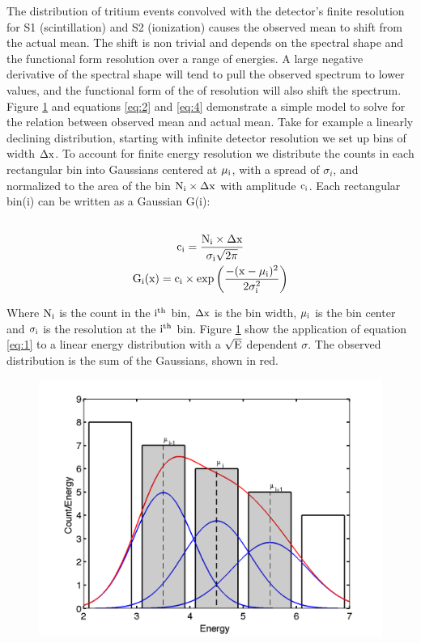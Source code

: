 The distribution of tritium events convolved with the detector's finite resolution for S1 (scintillation) and S2 (ionization) causes the observed mean to shift from the actual mean. The shift is non trivial and depends on the spectral shape and the functional form resolution over a range of energies. A large negative derivative of the spectral shape will tend to pull the observed spectrum to lower values, and the functional form of the of resolution will also shift the spectrum. Figure \ref{fig:exp_int} and equations \ref{eq:2} and \ref{eq:4} demonstrate a simple model to solve for the relation between observed mean and actual mean. Take for example a linearly declining distribution, starting with infinite detector resolution we set up bins of width $\rm \Delta x$. To account for finite energy resolution we distribute the counts in each rectangular bin into Gaussians centered at $\rm \mu_i$, with a spread of $\sigma_i$, and normalized to the area of the bin $\rm N_i \times \Delta x $ with amplitude $\rm c_i$. Each rectangular bin(i) can be written as a Gaussian G(i): \\ 
\begin{multline}
\\ \rm c_i=\frac{N_i \times \Delta x}{\sigma_i\sqrt{2\pi}} \\
\rm G_{i}(x) = c_i \times exp\left(\frac{-(x-\mu_i)^2}{2\sigma_i^2}\right)\\
\label{eq:1}
\end{multline}


Where $\rm N_i$ is the count in the $\rm i^{th}$ bin, $\rm \Delta x$ is the bin width, $\rm \mu_i$ is the bin center and $\rm \sigma_i$ is the resolution at the $\rm i^{th}$ bin. Figure \ref{fig:exp_int} show the application of equation \ref{eq:1} to a linear energy distribution with a $\rm \sqrt{E}$ dependent $\sigma$. The observed distribution is the sum of the Gaussians, shown in red.

 \begin{figure}[h!]\centering
\includegraphics[width=130mm]{Chapter_Flucs/Figures/example_integral}
\caption{}
\label{fig:exp_int}
\end{figure}


